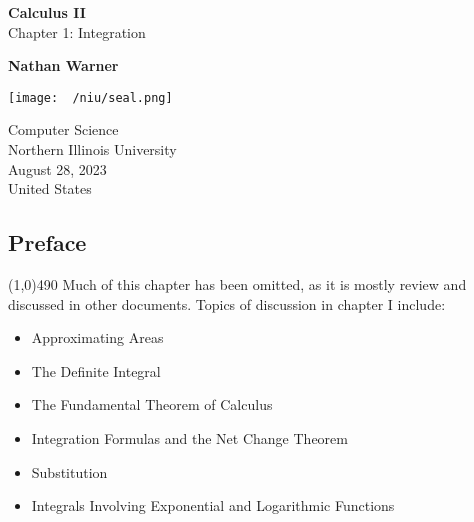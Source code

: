 \documentclass{report}
\title{\Huge{}}
\author{\huge{Nathan Warner}}
\date{\huge{}}
\begin{document}
        \begin{titlepage}
       \begin{center}
           \vspace*{1cm}
    
           \textbf{Calculus II} \\
           Chapter 1: Integration
    
           \vspace{0.5cm}
            
                
           \vspace{1.5cm}
    
           \textbf{Nathan Warner}
    
           \vfill
                
                
           \vspace{0.8cm}
         
           \texttt{[image: ~/niu/seal.png]}
                
           Computer Science \\
           Northern Illinois University\\
           August 28, 2023 \\
           United States\\
           
                
       \end{center}
    \end{titlepage}
    \tableofcontents
    \pagebreak \bigbreak \noindent
        \begin{center}
        \section*{\Huge Preface}
    \end{center}
    \bigbreak \noindent 
    \line(1,0){490}
    \bigbreak \noindent 
    Much of this chapter has been omitted, as it is mostly review and discussed in other documents. Topics of discussion in chapter I include:
    \begin{itemize}
        \item Approximating Areas
        \item The Definite Integral
        \item The Fundamental Theorem of Calculus
        \item Integration Formulas and the Net Change Theorem
        \item Substitution
        \item Integrals Involving Exponential and Logarithmic Functions
    \end{itemize}
\end{document}
